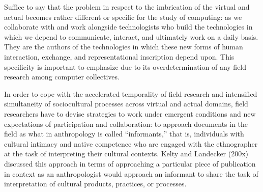 \documentclass[10pt,letter,oneside]{scrartcl}
\begin{document}
Suffice to say that the problem in respect to the imbrication of the
virtual and actual becomes rather different or specific for the study of
computing: as we collaborate with and work alongside technologists who
build the technologies in which we depend to communicate, interact, and
ultimately work on a daily basis. They are the authors of the
technologies in which these new forms of human interaction, exchange,
and representational inscription depend upon. This specificity is
important to emphasize due to its overdetermination of any field
research among computer collectives.  %

In order to cope with the accelerated temporality of field research and
intensified simultaneity of sociocultural processes across virtual and
actual domains, field researchers have to devise strategies to work
under emergent conditions and new expectations of participation and
collaboration: to approach documents in the field as what in
anthropology is called ``informants,'' that is, individuals with
cultural intimacy and native competence who are engaged with the
ethnographer at the task of interpreting their cultural contexts. Kelty
and Landecker (200x) discussed this approach in terms of approaching a
particular piece of publication in context as an anthropologist would
approach an informant to share the task of interpretation of cultural
products, practices, or processes.
\end{document}
